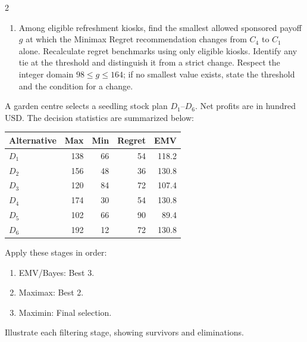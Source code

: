 \begin{multicols}{2}
\begin{enumerate}[label=\textbf{(\alph*)},leftmargin=*]
	\item Among eligible refreshment kiosks, find the smallest allowed sponsored payoff $g$ at which the Minimax Regret recommendation changes from $C_4$ to $C_1$ alone. Recalculate regret benchmarks using only eligible kiosks. Identify any tie at the threshold and distinguish it from a strict change. Respect the integer domain $98\leq g\leq164$; if no smallest value exists, state the threshold and the condition for a change. 
\end{enumerate}


\columnbreak
{}
A garden centre selects a seedling stock plan $D_1$--$D_6$. Net profits are in hundred USD. The decision statistics are summarized below:

\vspace{-3mm}
\begin{center}\small\setlength{\tabcolsep}{4pt}
	\begin{tabular}{lrrrr}\toprule
		Alternative & Max & Min & Regret & EMV\\ \midrule
		$D_1$ & 138 & 66 & 54 & 118.2\\
		$D_2$ & 156 & 48 & 36 & 130.8\\
		$D_3$ & 120 & 84 & 72 & 107.4\\
		$D_4$ & 174 & 30 & 54 & 130.8\\
		$D_5$ & 102 & 66 & 90 & 89.4\\
		$D_6$ & 192 & 12 & 72 & 130.8\\
		\bottomrule
	\end{tabular}
\end{center}
\vspace{-3mm}

Apply these stages in order:
\begin{enumerate}[leftmargin=*]
	\item EMV/Bayes: Best 3.
	\item Maximax: Best 2.
	\item Maximin: Final selection.
\end{enumerate}
Illustrate each filtering stage, showing survivors and eliminations.


\end{multicols}
\newpage

